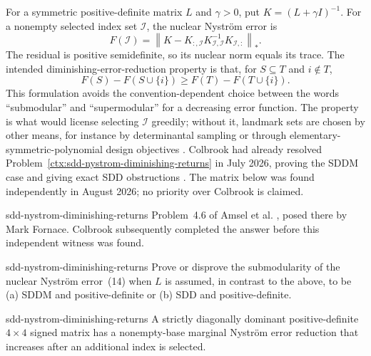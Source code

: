 
\begin{cxcredits}
\end{cxcredits}

\begin{cxcontext}
For a symmetric positive-definite matrix $L$ and $\gamma>0$, put
$K=(L+\gamma I)^{-1}$.  For a nonempty selected index set $\mathcal I$, the
nuclear Nystr\"om error is
\[
 F(\mathcal I)=\left\|K-K_{:,\mathcal I}
 K_{\mathcal I,\mathcal I}^{-1}K_{\mathcal I,:}\right\|_*.
\]
The residual is positive semidefinite, so its nuclear norm equals its trace.
The intended diminishing-error-reduction property is that, for
$S\subseteq T$ and $i\notin T$,
\[
 F(S)-F(S\cup\{i\})\geq F(T)-F(T\cup\{i\}).
\]
This formulation avoids the convention-dependent choice between the words
``submodular'' and ``supermodular'' for a decreasing error function.
The property is what would license selecting $\mathcal I$ greedily; without it,
landmark sets are chosen by other means, for instance by determinantal sampling
\citep{LiJegelkaSra2016} or through elementary-symmetric-polynomial design
objectives \citep{MarietSra2017}.
Colbrook had already resolved Problem~\ref{ctx:sdd-nystrom-diminishing-returns}
in July 2026, proving the SDDM case
and giving exact SDD obstructions \cite{Colbrook2026}.  The matrix below was
found independently in August 2026; no priority over Colbrook is claimed.
\end{cxcontext}

\begin{cxsource}{sdd-nystrom-diminishing-returns}
Problem~4.6 of Amsel et al. \cite{AmselEtAl2026}, posed there by Mark Fornace.
Colbrook \cite{Colbrook2026} subsequently completed the answer before this
independent witness was found.
\end{cxsource}

\begin{cxstatement}{sdd-nystrom-diminishing-returns}
Prove or disprove the submodularity of the nuclear Nystr\"om error~(14) when
$L$ is assumed, in contrast to the above, to be (a) SDDM and positive-definite
or (b) SDD and positive-definite.
\end{cxstatement}

\begin{cxsummary}{sdd-nystrom-diminishing-returns}
A strictly diagonally dominant positive-definite $4\times4$ signed matrix has
a nonempty-base marginal Nystr\"om error reduction that increases after an
additional index is selected.
\end{cxsummary}


